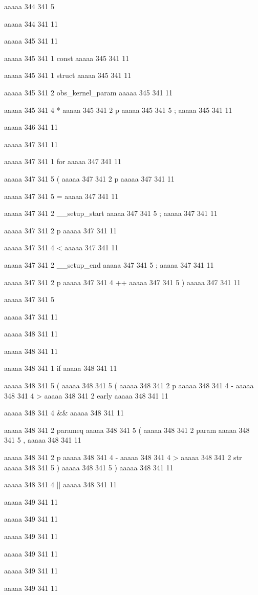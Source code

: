 aaaaa 344 341
5
{
aaaaa 344 341
11


aaaaa 345 341
11
	
aaaaa 345 341
1
const
aaaaa 345 341
11
 
aaaaa 345 341
1
struct
aaaaa 345 341
11
 
aaaaa 345 341
2
obs_kernel_param
aaaaa 345 341
11
 
aaaaa 345 341
4
*
aaaaa 345 341
2
p
aaaaa 345 341
5
;
aaaaa 345 341
11


aaaaa 346 341
11


aaaaa 347 341
11
	
aaaaa 347 341
1
for
aaaaa 347 341
11
 
aaaaa 347 341
5
(
aaaaa 347 341
2
p
aaaaa 347 341
11
 
aaaaa 347 341
5
=
aaaaa 347 341
11
 
aaaaa 347 341
2
__setup_start
aaaaa 347 341
5
;
aaaaa 347 341
11
 
aaaaa 347 341
2
p
aaaaa 347 341
11
 
aaaaa 347 341
4
<
aaaaa 347 341
11
 
aaaaa 347 341
2
__setup_end
aaaaa 347 341
5
;
aaaaa 347 341
11
 
aaaaa 347 341
2
p
aaaaa 347 341
4
++
aaaaa 347 341
5
)
aaaaa 347 341
11
 
aaaaa 347 341
5
{
aaaaa 347 341
11


aaaaa 348 341
11
	
aaaaa 348 341
11
	
aaaaa 348 341
1
if
aaaaa 348 341
11
 
aaaaa 348 341
5
(
aaaaa 348 341
5
(
aaaaa 348 341
2
p
aaaaa 348 341
4
-
aaaaa 348 341
4
>
aaaaa 348 341
2
early
aaaaa 348 341
11
 
aaaaa 348 341
4
&&
aaaaa 348 341
11
 
aaaaa 348 341
2
parameq
aaaaa 348 341
5
(
aaaaa 348 341
2
param
aaaaa 348 341
5
,
aaaaa 348 341
11
 
aaaaa 348 341
2
p
aaaaa 348 341
4
-
aaaaa 348 341
4
>
aaaaa 348 341
2
str
aaaaa 348 341
5
)
aaaaa 348 341
5
)
aaaaa 348 341
11
 
aaaaa 348 341
4
||
aaaaa 348 341
11


aaaaa 349 341
11
	
aaaaa 349 341
11
	
aaaaa 349 341
11
 
aaaaa 349 341
11
 
aaaaa 349 341
11
 
aaaaa 349 341
11
 
}}

